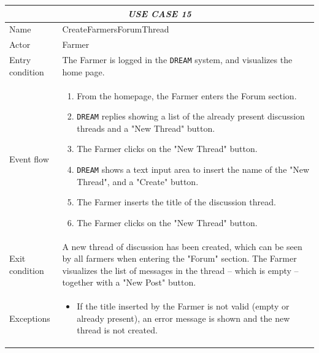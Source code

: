 \documentclass{article}
\begin{document}

\centering
\begin{longtable}{|p{3.5cm}|m{8cm}|}
 \hline
 \multicolumn{2}{|c|}{\cellcolor{white}\emph{USE CASE 15}} \\
 \endfirsthead
 \endhead
 \endfoot
 \endlastfoot
 \hline
 Name & CreateFarmersForumThread\\
 \hline
 Actor & Farmer\\
 \hline
 Entry condition & The Farmer is logged in the \verb|DREAM| system, and visualizes the home page.\\
 \hline
 Event flow & \begin{enumerate}
    \item From the homepage, the Farmer enters the Forum section.
    \item \verb|DREAM| replies showing a list of the already present discussion threads and a "New Thread" button.
    \item The Farmer clicks on the "New Thread" button.
    \item \verb|DREAM| shows a text input area to insert the name of the "New Thread",  and a "Create" button.
    \item The Farmer inserts the title of the discussion thread.
    \item The Farmer clicks on the "New Thread" button.

 \end{enumerate}\\
 \hline
 Exit condition & A new thread of discussion has been created, which can be seen by all farmers when entering the "Forum" section.
The Farmer visualizes the list of messages in the thread – which is empty – together with a "New Post" button.\\
 \hline
 Exceptions & \begin{itemize}
     \item If the title inserted by the Farmer is not valid (empty or already present), an error message is shown and the new thread is not created.
 \end{itemize}\\
 \hline
\end{longtable}

\end{document}

